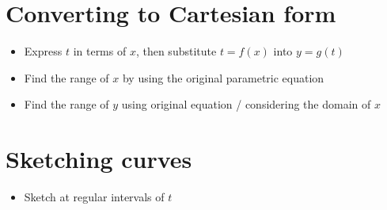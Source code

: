 \section{Converting to Cartesian form}
\begin{itemize}
    \item Express $t$ in terms of $x$, then substitute $t=f(x)$ into $y=g(t)$
    \item Find the range of $x$ by using the original parametric equation
    \item Find the range of $y$ using original equation / considering the domain of $x$
\end{itemize}
\section{Sketching curves}
\begin{itemize}
    \item Sketch at regular intervals of $t$
\end{itemize}
